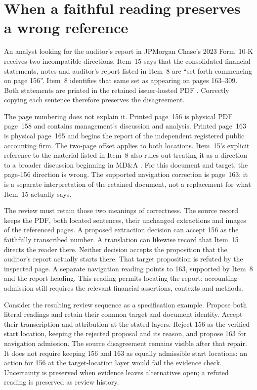 \section{When a faithful reading preserves a wrong reference}
\label{sec:reference-conflict}

An analyst looking for the auditor's report in JPMorgan Chase's 2023 Form~10-K
receives two incompatible directions. Item~15 says that the consolidated
financial statements, notes and auditor's report listed in Item~8 are
``set forth commencing on page 156''. Item~8 identifies that same set as
appearing on pages 163--309. Both statements are printed in the retained
issuer-hosted PDF \citep[Items 8 and 15, printed pp.~36 and 40]{jpmorgan2023tenk}.
Correctly copying each sentence therefore preserves the disagreement.

The page numbering does not explain it. Printed page~156 is physical PDF
page~158 and contains management's discussion and analysis. Printed page~163
is physical page~165 and begins the report of the independent registered public
accounting firm. The two-page offset applies to both locations. Item~15's
explicit reference to the material listed in Item~8 also rules out treating
it as a direction to a broader discussion beginning in MD\&A
\citep[printed pp.~156 and 163]{jpmorgan2023tenk}. For this document and
target, the page-156 direction is wrong. The supported navigation correction
is page~163; it is a separate interpretation of the retained document, not
a replacement for what Item~15 actually says.

The review must retain those two meanings of correctness. The source record
keeps the PDF, both located sentences, their unchanged extractions and images
of the referenced pages. A proposed extraction decision can accept 156 as
the faithfully transcribed number. A translation can likewise record that
Item~15 directs the reader there. Neither decision accepts the proposition
that the auditor's report actually starts there. That target proposition is
refuted by the inspected page. A separate navigation reading points to 163,
supported by Item~8 and the report heading. This reading permits locating the
report; accounting admission still requires the relevant financial assertions,
contexts and methods.

Consider the resulting review sequence as a specification example. Propose
both literal readings and retain their common target and document identity.
Accept their transcription and attribution at the stated layers. Reject 156
as the verified start location, keeping the rejected proposal and its reason,
and propose 163 for navigation admission. The source disagreement remains
visible after that repair. It does not require keeping 156 and 163 as equally
admissible start locations: an  action for 156 at the
target-location layer would fail the evidence check. Uncertainty is preserved
when evidence leaves alternatives open; a refuted reading is preserved as
review history.

